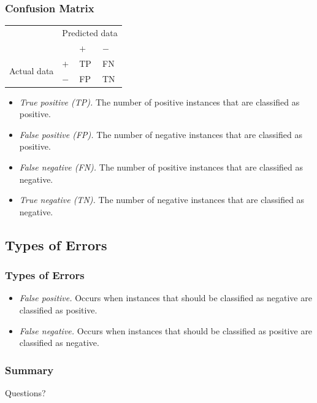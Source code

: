 \documentclass{beamer}
\begin{document}
\begin{frame}

    \frametitle{Confusion Matrix}

    \begin{table}[h]
        \centering
                \begin{tabular}{l|lll}
                    \hline
                                         & \multicolumn{3}{c}{Predicted data}  \\\cline{2-4}
                                            & &$+$ & $-$        \\\hline
                     \multirow{2}{*}{Actual data}& $+$&\multicolumn{1}{l}{TP} & \multicolumn{1}{l}{FN} \\\cline{2-4}
                                       & $-$ & \multicolumn{1}{l}{FP} & \multicolumn{1}{l}{TN} \\\hline
                \end{tabular}
        \end{table}


    \begin{itemize}
        \item \textit{True positive (TP).} The number of positive instances that are classified as positive.
        \item \textit{False positive (FP).} The number of negative instances that are classified as positive.
        \item \textit{False negative (FN).} The number of positive instances that are classified as negative.
        \item \textit{True negative (TN).} The number of negative instances that are classified as negative.
    \end{itemize}
    

\end{frame}

\subsection{Types of Errors}

\begin{frame}
    \frametitle{Types of Errors}


    \begin{itemize}
        \item \textit{False positive.} Occurs when instances that should be classified as negative are classified as positive.
        \item \textit{False negative.} Occurs when instances that should be classified as positive are classified as negative.
    \end{itemize}
    

\end{frame}


\begin{frame}
    \frametitle{Summary}

\tableofcontents


\end{frame}


\begin{frame}

    \begin{center}
        \Huge Questions?
    \end{center}

\end{frame}
\end{document}

